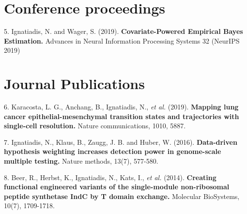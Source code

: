 \documentclass[margin,line]{res}
\newenvironment{list1}{
  \begin{list}{\ding{113}}{%
      \setlength{\itemsep}{0in}
      \setlength{\parsep}{0in} \setlength{\parskip}{0in}
      \setlength{\topsep}{0in} \setlength{\partopsep}{0in}
      \setlength{\leftmargin}{0.17in}}}{\end{list}}
\begin{document}
\begin{resume}
\section{\sc Conference proceedings}
\begin{list1}
\item[5.] Ignatiadis, N. and Wager, S. (2019). \textbf{Covariate-Powered Empirical Bayes Estimation.} Advances in Neural Information Processing Systems 32 (NeurIPS 2019)
\end{list1}
\section{\sc Journal Publications}
\begin{list1}
\item[6.] Karacosta, L. G., Anchang, B., Ignatiadis, N., \emph{et al.} (2019). \textbf{ Mapping lung cancer epithelial-mesenchymal transition states and trajectories with single-cell resolution.} Nature communications, 1010, 5887.
\item[7.]  Ignatiadis, N., Klaus, B., Zaugg, J. B. and Huber, W. (2016). \textbf{Data-driven hypothesis weighting increases detection power in genome-scale multiple testing.} Nature methods, 13(7), 577-580.
\item[8.] Beer, R., Herbst, K., Ignatiadis, N., Kats, I., \emph{et al.} (2014). \textbf{Creating functional engineered variants of the single-module non-ribosomal peptide synthetase IndC by T domain exchange.} Molecular BioSystems, 10(7), 1709-1718.
\end{list1}


\end{resume}
\end{document}
